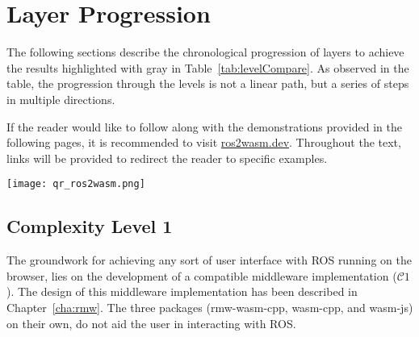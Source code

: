 \section{Layer Progression}

    The following sections describe the chronological progression of layers to achieve the results highlighted with gray in Table~\ref{tab:levelCompare}. As observed in the table, the progression through the levels is not a linear path, but a series of steps in multiple directions.

    \vspace{1em}
    \begin{tcolorbox}[title=Note]
        \begin{minipage}[t]{0.87\linewidth}
            \vspace*{0pt}
            If the reader would like to follow along with the demonstrations
            provided in the following pages, it is recommended to visit 
            \href{https://ros2wasm.dev/}{\textsf{ros2wasm.dev}}.
            Throughout the text, links will be provided to redirect the reader 
            to specific examples.
        \end{minipage}\hfill%
        \begin{minipage}[t]{0.1\linewidth}
            \vspace*{0pt}
            \texttt{[image: qr\_ros2wasm.png]}
        \end{minipage}
    \end{tcolorbox}


        \subsection{Complexity Level 1}

        The groundwork for achieving any sort of user interface with \ac{ROS} running on the browser, lies on the development of a compatible middleware implementation ($\mathcal{C}1$). The design of this middleware implementation has been described in Chapter~\ref{cha:rmw}. The three packages (\textsf{rmw-wasm-cpp}, \textsf{wasm-cpp}, and \textsf{wasm-js}) on their own, do not aid the user in interacting with \ac{ROS}.

